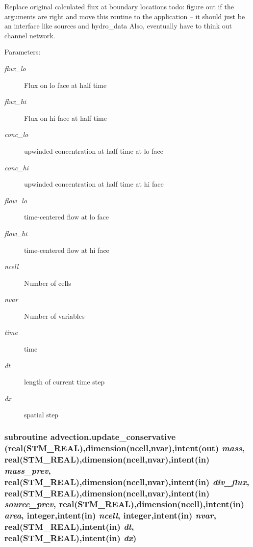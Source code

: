 Replace original calculated flux at boundary locations todo: figure out if the arguments are right and move this routine to the application -- it should just be an interface like sources and hydro\_\-data Also, eventually have to think out channel network. 

\begin{Desc}
\item[Parameters:]
\begin{description}
\item[{\em flux\_\-lo}]Flux on lo face at half time\item[{\em flux\_\-hi}]Flux on hi face at half time\item[{\em conc\_\-lo}]upwinded concentration at half time at lo face\item[{\em conc\_\-hi}]upwinded concentration at half time at hi face\item[{\em flow\_\-lo}]time-centered flow at lo face\item[{\em flow\_\-hi}]time-centered flow at hi face\item[{\em ncell}]Number of cells\item[{\em nvar}]Number of variables\item[{\em time}]time\item[{\em dt}]length of current time step\item[{\em dx}]spatial step \end{description}
\end{Desc}
\hypertarget{a00026_3785ecc18bdbada28d0be139c7839690}{
\subsubsection[{update\_\-conservative}]{\setlength{\rightskip}{0pt plus 5cm}subroutine advection.update\_\-conservative (real(STM\_\-REAL),dimension(ncell,nvar),intent(out) {\em mass}, \/  real(STM\_\-REAL),dimension(ncell,nvar),intent(in) {\em mass\_\-prev}, \/  real(STM\_\-REAL),dimension(ncell,nvar),intent(in) {\em div\_\-flux}, \/  real(STM\_\-REAL),dimension(ncell,nvar),intent(in) {\em source\_\-prev}, \/  real(STM\_\-REAL),dimension(ncell),intent(in) {\em area}, \/  integer,intent(in) {\em ncell}, \/  integer,intent(in) {\em nvar}, \/  real(STM\_\-REAL),intent(in) {\em dt}, \/  real(STM\_\-REAL),intent(in) {\em dx})}}
\label{a00026_3785ecc18bdbada28d0be139c7839690}


